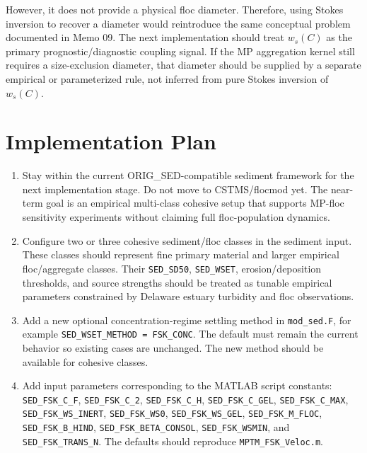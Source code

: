 \documentclass[11pt]{article}
\begin{document}
However, it does not provide a physical floc diameter.  Therefore, using
Stokes inversion to recover a diameter would reintroduce the same conceptual
problem documented in Memo 09.  The next implementation should treat
$w_s(C)$ as the primary prognostic/diagnostic coupling signal.  If the MP
aggregation kernel still requires a size-exclusion diameter, that diameter
should be supplied by a separate empirical or parameterized rule, not inferred
from pure Stokes inversion of $w_s(C)$.

\section*{Implementation Plan}

\begin{enumerate}
  \item Stay within the current ORIG\_SED-compatible sediment framework for the
        next implementation stage.  Do not move to CSTMS/flocmod yet.  The
        near-term goal is an empirical multi-class cohesive setup that supports
        MP-floc sensitivity experiments without claiming full floc-population
        dynamics.
  \item Configure two or three cohesive sediment/floc classes in the sediment
        input.  These classes should represent fine primary material and larger
        empirical floc/aggregate classes.  Their \texttt{SED\_SD50},
        \texttt{SED\_WSET}, erosion/deposition thresholds, and source strengths
        should be treated as tunable empirical parameters constrained by
        Delaware estuary turbidity and floc observations.
  \item Add a new optional concentration-regime settling method in
        \texttt{mod\_sed.F}, for example
        \texttt{SED\_WSET\_METHOD = FSK\_CONC}.  The default must remain the
        current behavior so existing cases are unchanged.  The new method
        should be available for cohesive classes.
  \item Add input parameters corresponding to the MATLAB script constants:
        \texttt{SED\_FSK\_C\_F}, \texttt{SED\_FSK\_C\_2},
        \texttt{SED\_FSK\_C\_H}, \texttt{SED\_FSK\_C\_GEL},
        \texttt{SED\_FSK\_C\_MAX}, \texttt{SED\_FSK\_WS\_INERT},
        \texttt{SED\_FSK\_WS0}, \texttt{SED\_FSK\_WS\_GEL},
        \texttt{SED\_FSK\_M\_FLOC}, \texttt{SED\_FSK\_B\_HIND},
        \texttt{SED\_FSK\_BETA\_CONSOL}, \texttt{SED\_FSK\_WSMIN}, and
        \texttt{SED\_FSK\_TRANS\_N}.  The defaults should reproduce
        \texttt{MPTM\_FSK\_Veloc.m}.

\end{enumerate}
\end{document}
